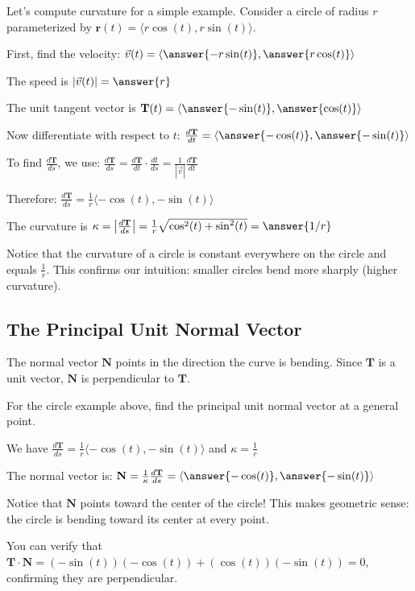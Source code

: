 \documentclass{ximera}
\begin{document}
\begin{problem}
Let's compute curvature for a simple example. Consider a circle of radius $r$ parameterized by $\mathbf{r}(t) = \langle r\cos(t), r\sin(t) \rangle$.

First, find the velocity: $\vec{v}(t) = \langle \answer{-r\sin(t)}, \answer{r\cos(t)} \rangle$

The speed is $|\vec{v}(t)| = \answer{r}$

The unit tangent vector is $\mathbf{T}(t) = \langle \answer{-\sin(t)}, \answer{\cos(t)} \rangle$

Now differentiate with respect to $t$: $\frac{d\mathbf{T}}{dt} = \langle \answer{-\cos(t)}, \answer{-\sin(t)} \rangle$

To find $\frac{d\mathbf{T}}{ds}$, we use: $\frac{d\mathbf{T}}{ds} = \frac{d\mathbf{T}}{dt} \cdot \frac{dt}{ds} = \frac{1}{|\vec{v}|} \frac{d\mathbf{T}}{dt}$

Therefore: $\frac{d\mathbf{T}}{ds} = \frac{1}{r}\langle -\cos(t), -\sin(t) \rangle$

The curvature is $\kappa = \left|\frac{d\mathbf{T}}{ds}\right| = \frac{1}{r}\sqrt{\cos^2(t) + \sin^2(t)} = \answer{1/r}$

\begin{feedback}
Notice that the curvature of a circle is constant everywhere on the circle and equals $\frac{1}{r}$. This confirms our intuition: smaller circles bend more sharply (higher curvature).
\end{feedback}
\end{problem}

\subsection*{The Principal Unit Normal Vector}

The normal vector $\mathbf{N}$ points in the direction the curve is bending. Since $\mathbf{T}$ is a unit vector, $\mathbf{N}$ is perpendicular to $\mathbf{T}$.

\begin{problem}
For the circle example above, find the principal unit normal vector at a general point.

We have $\frac{d\mathbf{T}}{ds} = \frac{1}{r}\langle -\cos(t), -\sin(t) \rangle$ and $\kappa = \frac{1}{r}$

The normal vector is: $\mathbf{N} = \frac{1}{\kappa}\frac{d\mathbf{T}}{ds} = \langle \answer{-\cos(t)}, \answer{-\sin(t)} \rangle$

\begin{feedback}
Notice that $\mathbf{N}$ points toward the center of the circle! This makes geometric sense: the circle is bending toward its center at every point.

You can verify that $\mathbf{T} \cdot \mathbf{N} = (-\sin(t))(-\cos(t)) + (\cos(t))(-\sin(t)) = 0$, confirming they are perpendicular.
\end{feedback}
\end{problem}
\end{document}
